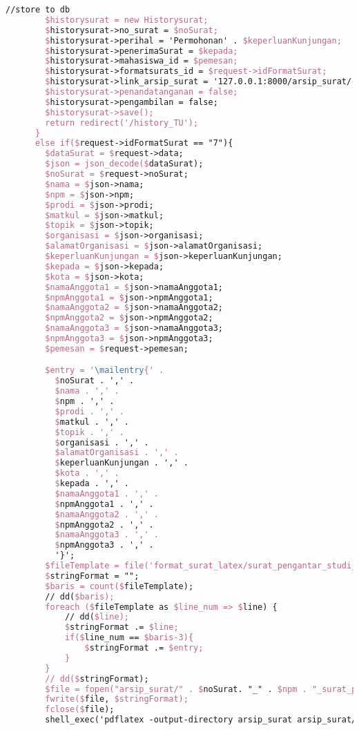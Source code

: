 \begin{lstlisting}[language=tex,basicstyle=\tiny,caption=HistorysuratController.php]
        //store to db
        $historysurat = new Historysurat;
        $historysurat->no_surat = $noSurat;
        $historysurat->perihal = 'Permohonan' . $keperluanKunjungan;
        $historysurat->penerimaSurat = $kepada;
        $historysurat->mahasiswa_id = $pemesan;
        $historysurat->formatsurats_id = $request->idFormatSurat;
        $historysurat->link_arsip_surat = '127.0.0.1:8000/arsip_surat/' . $noSurat. '_' . $npm . '_surat_pengantar_studi_lapangan_3orang.pdf';
        $historysurat->penandatanganan = false;
        $historysurat->pengambilan = false;
        $historysurat->save();
        return redirect('/history_TU');
      }
      else if($request->idFormatSurat == "7"){
        $dataSurat = $request->data;
        $json = json_decode($dataSurat);
        $noSurat = $request->noSurat;
        $nama = $json->nama;
        $npm = $json->npm;
        $prodi = $json->prodi;
        $matkul = $json->matkul;
        $topik = $json->topik;
        $organisasi = $json->organisasi;
        $alamatOrganisasi = $json->alamatOrganisasi;
        $keperluanKunjungan = $json->keperluanKunjungan;
        $kepada = $json->kepada;
        $kota = $json->kota;
        $namaAnggota1 = $json->namaAnggota1;
        $npmAnggota1 = $json->npmAnggota1;
        $namaAnggota2 = $json->namaAnggota2;
        $npmAnggota2 = $json->npmAnggota2;
        $namaAnggota3 = $json->namaAnggota3;
        $npmAnggota3 = $json->npmAnggota3;
        $pemesan = $request->pemesan;

        $entry = '\mailentry{' .
          $noSurat . ',' .
          $nama . ',' .
          $npm . ',' .
          $prodi . ',' .
          $matkul . ',' .
          $topik . ',' .
          $organisasi . ',' .
          $alamatOrganisasi . ',' .
          $keperluanKunjungan . ',' .
          $kota . ',' .
          $kepada . ',' .
          $namaAnggota1 . ',' .
          $npmAnggota1 . ',' .
          $namaAnggota2 . ',' .
          $npmAnggota2 . ',' .
          $namaAnggota3 . ',' .
          $npmAnggota3 . ',' .
          '}';
        $fileTemplate = file('format_surat_latex/surat_pengantar_studi_lapangan_4orang.tex');
        $stringFormat = "";
        $baris = count($fileTemplate);
        // dd($baris);
        foreach ($fileTemplate as $line_num => $line) {
            // dd($line);
            $stringFormat .= $line;
            if($line_num == $baris-3){
                $stringFormat .= $entry;
            }
        }
        // dd($stringFormat);
        $file = fopen("arsip_surat/" . $noSurat. "_" . $npm . "_surat_pengantar_studi_lapangan_4orang.tex", "w");
        fwrite($file, $stringFormat);
        fclose($file);
        shell_exec('pdflatex -output-directory arsip_surat arsip_surat/' . $noSurat . '_' . $npm . '_surat_pengantar_studi_lapangan_4orang.tex');


\end{lstlisting}
